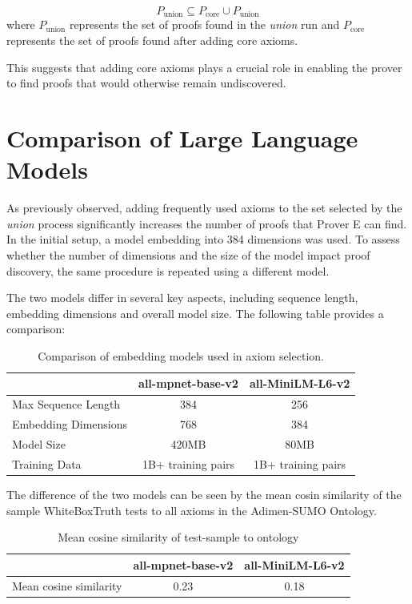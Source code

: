 \documentclass[english,version-2020-11]{uzl-thesis}
\begin{document}
\begin{equation}
    P_{\text{union}} \subseteq P_{\text{core}} \cup P_{\text{union}}
\end{equation}
where \( P_{\text{union}} \) represents the set of proofs found in the \textit{union} run and \( P_{\text{core}} \) represents the set of proofs found after adding core axioms.


This suggests that adding core axioms plays a crucial role in enabling the prover to find proofs that would otherwise remain undiscovered.


\section{Comparison of Large Language Models}

As previously observed, adding frequently used axioms to the set selected by the \textit{union} process significantly increases the number of proofs that Prover E can find. In the initial setup, a model embedding into 384 dimensions was used. To assess whether the number of dimensions and the size of the model impact proof discovery, the same procedure is repeated using a different model.

The two models differ in several key aspects, including sequence length, embedding dimensions and overall model size. The following table provides a comparison:

\begin{table}[h]
    \centering
    \begin{tabular}{lcc}
        \hline
        & \textbf{all-mpnet-base-v2} & \textbf{all-MiniLM-L6-v2} \\
        \hline
        Max Sequence Length & 384 & 256 \\
        Embedding Dimensions & 768 & 384 \\
        Model Size & 420MB & 80MB \\
        Training Data & 1B+ training pairs & 1B+ training pairs \\
        \hline
    \end{tabular}
    \caption{Comparison of embedding models used in axiom selection.}
    \label{tab:model_comparison}
\end{table}

The difference of the two models can be seen by the mean cosin similarity of the sample WhiteBoxTruth tests to all axioms in the Adimen-SUMO Ontology.


\begin{table}[h]
    \centering
    \begin{tabular}{lcc}
        \hline
        & \textbf{all-mpnet-base-v2} & \textbf{all-MiniLM-L6-v2} \\
        \hline
        Mean cosine similarity & 0.23 & 0.18 \\
        \hline
    \end{tabular}
    \caption{Mean cosine similarity of test-sample to ontology}
    \label{tab:model_comparison_2}
\end{table}
\end{document}
